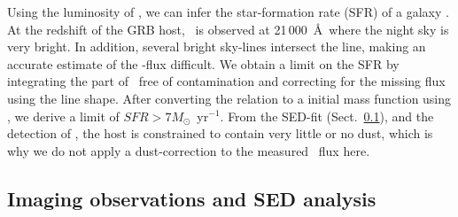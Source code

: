 \documentclass{aa}    %
\begin{document}
Using the luminosity of \ha, we can infer the star-formation rate (SFR) of a 
galaxy \citep{Kennicutt1998}. At the redshift of the GRB host, \ha~is observed at 
21\,000~\AA~where the night sky is very bright. In addition, several bright sky-lines 
intersect the line, making an accurate estimate of the \ha-flux difficult. 
We obtain a limit on the SFR by integrating the part of \ha~free of contamination and 
correcting for the missing flux using the line shape. After converting the 
\citet{Kennicutt1998} relation to a \citet{Chabrier2003} initial mass function using
\citet{Madau2014}, we derive a limit of $SFR > 7 M_\odot$~yr$^{-1}$. 
From the SED-fit (Sect.~\ref{SED}), and the detection of \lya, the host is
constrained to contain very little or no dust, which is why we do not apply 
a dust-correction to the measured \ha~flux here.





\subsection{Imaging observations and SED analysis} \label{SED}
\end{document}
